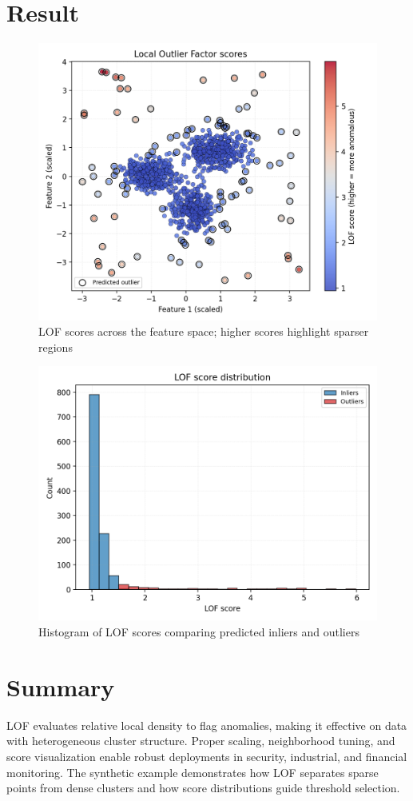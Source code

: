 ﻿\documentclass[12pt]{article}
\begin{document}
\section{Result}
\begin{figure}[H]
  \centering
  \includegraphics[width=0.82\linewidth]{lof_decision_map.png}
  \caption{LOF scores across the feature space; higher scores highlight sparser regions}
  \label{fig:lof_decision_map}
\end{figure}

\begin{figure}[H]
  \centering
  \includegraphics[width=0.78\linewidth]{lof_score_hist.png}
  \caption{Histogram of LOF scores comparing predicted inliers and outliers}
  \label{fig:lof_score_hist}
\end{figure}

\FloatBarrier
\section{Summary}
LOF evaluates relative local density to flag anomalies, making it effective on data with heterogeneous cluster structure. Proper scaling, neighborhood tuning, and score visualization enable robust deployments in security, industrial, and financial monitoring. The synthetic example demonstrates how LOF separates sparse points from dense clusters and how score distributions guide threshold selection.
\end{document}
